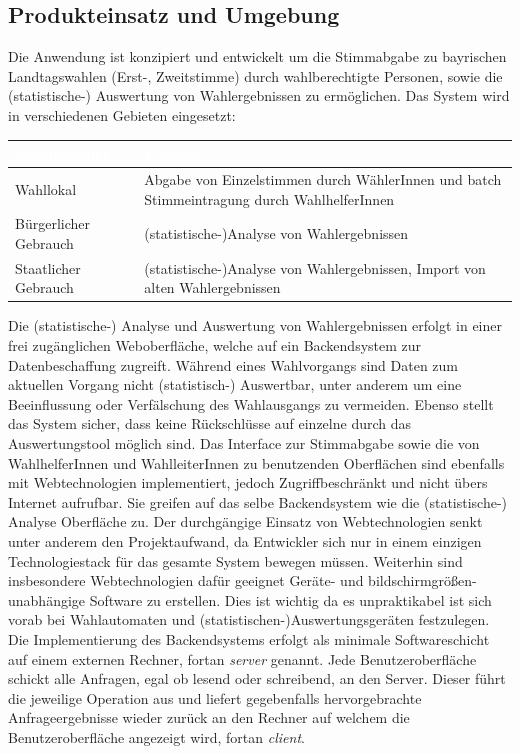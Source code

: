 \documentclass[a4paper,12pt]{article}
\begin{document}
\subsection{Produkteinsatz und Umgebung}
Die Anwendung ist konzipiert und entwickelt um die Stimmabgabe 
zu bayrischen Landtagswahlen (Erst-, Zweitstimme) durch wahlberechtigte
Personen, sowie die (statistische-) Auswertung von Wahlergebnissen zu ermöglichen. 
%
Das System wird in verschiedenen Gebieten eingesetzt:

\begin{center}
\begin{tabular}{|m{5cm}|m{10cm}|}
	\hline
  \rowcolor{TUMBlue} \textcolor{white}{\textbf{Einsatzgebiet}} & \textcolor{white}{\textbf{Prozesse}} \\
  \hline
  Wahllokal & Abgabe von Einzelstimmen durch WählerInnen und batch Stimmeintragung durch WahlhelferInnen \\
	\hline
  Bürgerlicher Gebrauch & (statistische-)Analyse von Wahlergebnissen \\
  \hline
  Staatlicher Gebrauch & (statistische-)Analyse von Wahlergebnissen, Import von alten Wahlergebnissen \\
	\hline
\end{tabular}
\end{center}

Die (statistische-) Analyse und Auswertung von Wahlergebnissen erfolgt in einer frei zugänglichen
Weboberfläche, welche auf ein Backendsystem zur Datenbeschaffung zugreift. 
Während eines Wahlvorgangs sind Daten zum aktuellen Vorgang nicht (statistisch-) Auswertbar,
unter anderem um eine Beeinflussung oder Verfälschung des Wahlausgangs zu vermeiden.
Ebenso stellt das System sicher, dass keine Rückschlüsse auf einzelne durch das Auswertungstool
möglich sind.
%
Das Interface zur Stimmabgabe sowie die von WahlhelferInnen und WahlleiterInnen zu benutzenden Oberflächen sind 
ebenfalls mit Webtechnologien implementiert, jedoch Zugriffbeschränkt und nicht übers Internet aufrufbar. Sie greifen
auf das selbe Backendsystem wie die (statistische-) Analyse Oberfläche zu.
%
Der durchgängige Einsatz von Webtechnologien senkt unter anderem den Projektaufwand, da Entwickler sich nur in 
einem einzigen Technologiestack für das gesamte System bewegen müssen. Weiterhin sind insbesondere 
Webtechnologien dafür geeignet Geräte- und bildschirmgrößen-unabhängige Software zu erstellen. Dies ist wichtig
da es unpraktikabel ist sich vorab bei Wahlautomaten und (statistischen-)Auswertungsgeräten festzulegen.
%
Die Implementierung des Backendsystems erfolgt als minimale Softwareschicht auf einem externen 
Rechner, fortan \textit{server} genannt. Jede Benutzeroberfläche schickt alle Anfragen, egal ob lesend oder schreibend, 
an den Server. Dieser führt die jeweilige Operation aus und liefert gegebenfalls hervorgebrachte
Anfrageergebnisse wieder zurück an den Rechner auf welchem die Benutzeroberfläche angezeigt wird, fortan \textit{client}.
\end{document}
